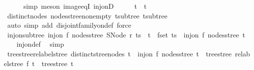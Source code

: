 \begin{isabellebody}
\ \ \ \ \isamarkupfalse%
\ {\isacharparenleft}{\kern0pt}simp{\isacharcomma}{\kern0pt}\ meson\ image{\isacharunderscore}{\kern0pt}eqI\ inj{\isacharunderscore}{\kern0pt}onD{\isacharparenright}{\kern0pt}\isanewline
\ \ \isamarkupfalse%
\ \isamarkupfalse%
\ {\isachardoublequoteopen}t{}\ {\isacharequal}{\kern0pt}\ t{}{\isachardoublequoteclose}\ \isamarkupfalse%
\ distinct{\isacharunderscore}{\kern0pt}nodes\ nodes{\isacharunderscore}{\kern0pt}stree{\isacharunderscore}{\kern0pt}non{\isacharunderscore}{\kern0pt}empty\ t{}{\isacharunderscore}{\kern0pt}subtree\ t{}{\isacharunderscore}{\kern0pt}subtree\isanewline
\ \ \ \ \isamarkupfalse%
\ {\isacharparenleft}{\kern0pt}auto\ simp\ add{\isacharcolon}{\kern0pt}\ disjoint{\isacharunderscore}{\kern0pt}family{\isacharunderscore}{\kern0pt}on{\isacharunderscore}{\kern0pt}def{\isacharcomma}{\kern0pt}\ force{\isacharparenright}{\kern0pt}\isanewline
{}\isamarkupfalse%
%
\endisatagproof
{\isafoldproof}%
%
\isadelimproof
\isanewline
%
\endisadelimproof
\isanewline
{}\isamarkupfalse%
\ inj{\isacharunderscore}{\kern0pt}on{\isacharunderscore}{\kern0pt}subtree{\isacharcolon}{\kern0pt}\ {\isachardoublequoteopen}inj{\isacharunderscore}{\kern0pt}on\ f\ {\isacharparenleft}{\kern0pt}nodes{\isacharunderscore}{\kern0pt}stree\ {\isacharparenleft}{\kern0pt}SNode\ r\ ts{\isacharparenright}{\kern0pt}{\isacharparenright}{\kern0pt}\ {\isasymLongrightarrow}\ t\ {\isasymin}\ fset\ ts\ {\isasymLongrightarrow}\ inj{\isacharunderscore}{\kern0pt}on\ f\ {\isacharparenleft}{\kern0pt}nodes{\isacharunderscore}{\kern0pt}stree\ t{\isacharparenright}{\kern0pt}{\isachardoublequoteclose}\isanewline
%
\isadelimproof
\ \ %
\endisadelimproof
%
\isatagproof
{}\isamarkupfalse%
\ inj{\isacharunderscore}{\kern0pt}on{\isacharunderscore}{\kern0pt}def\ \isamarkupfalse%
\ simp%
\endisatagproof
{\isafoldproof}%
%
\isadelimproof
\isanewline
%
\endisadelimproof
\isanewline
{}\isamarkupfalse%
\ tree{\isacharunderscore}{\kern0pt}stree{\isacharunderscore}{\kern0pt}relabel{\isacharunderscore}{\kern0pt}stree{\isacharcolon}{\kern0pt}\ {\isachardoublequoteopen}distinct{\isacharunderscore}{\kern0pt}stree{\isacharunderscore}{\kern0pt}nodes\ t\ {\isasymLongrightarrow}\ inj{\isacharunderscore}{\kern0pt}on\ f\ {\isacharparenleft}{\kern0pt}nodes{\isacharunderscore}{\kern0pt}stree\ t{\isacharparenright}{\kern0pt}\ {\isasymLongrightarrow}\ tree{\isacharunderscore}{\kern0pt}stree\ {\isacharparenleft}{\kern0pt}relabel{\isacharunderscore}{\kern0pt}stree\ f\ t{\isacharparenright}{\kern0pt}\ {\isacharequal}{\kern0pt}\ tree{\isacharunderscore}{\kern0pt}stree\ t{\isachardoublequoteclose}\isanewline

\end{isabellebody}
